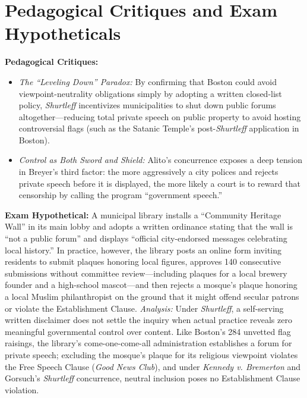 \documentclass[12pt]{article}
\begin{document}
\section{Pedagogical Critiques and Exam Hypotheticals}
\textbf{Pedagogical Critiques:}
\begin{itemize}
  \item \textit{The ``Leveling Down'' Paradox:} By confirming that Boston could avoid viewpoint-neutrality obligations simply by adopting a written closed-list policy, \textit{Shurtleff} incentivizes municipalities to shut down public forums altogether---reducing total private speech on public property to avoid hosting controversial flags (such as the Satanic Temple's post-\textit{Shurtleff} application in Boston).
  \item \textit{Control as Both Sword and Shield:} Alito's concurrence exposes a deep tension in Breyer's third factor: the more aggressively a city polices and rejects private speech before it is displayed, the more likely a court is to reward that censorship by calling the program ``government speech.''
\end{itemize}

\textbf{Exam Hypothetical:} A municipal library installs a ``Community Heritage Wall'' in its main lobby and adopts a written ordinance stating that the wall is ``not a public forum'' and displays ``official city-endorsed messages celebrating local history.'' In practice, however, the library posts an online form inviting residents to submit plaques honoring local figures, approves 140 consecutive submissions without committee review---including plaques for a local brewery founder and a high-school mascot---and then rejects a mosque's plaque honoring a local Muslim philanthropist on the ground that it might offend secular patrons or violate the Establishment Clause. \textit{Analysis:} Under \textit{Shurtleff}, a self-serving written disclaimer does not settle the inquiry when actual practice reveals zero meaningful governmental control over content. Like Boston's 284 unvetted flag raisings, the library's come-one-come-all administration establishes a forum for private speech; excluding the mosque's plaque for its religious viewpoint violates the Free Speech Clause (\textit{Good News Club}), and under \textit{Kennedy v. Bremerton} and Gorsuch's \textit{Shurtleff} concurrence, neutral inclusion poses no Establishment Clause violation.
\end{document}
